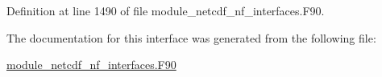 Definition at line 1490 of file module\+\_\+netcdf\+\_\+nf\+\_\+interfaces.\+F90.



The documentation for this interface was generated from the following file\+:\begin{DoxyCompactItemize}
\item 
\hyperlink{module__netcdf__nf__interfaces_8F90}{module\+\_\+netcdf\+\_\+nf\+\_\+interfaces.\+F90}\end{DoxyCompactItemize}
